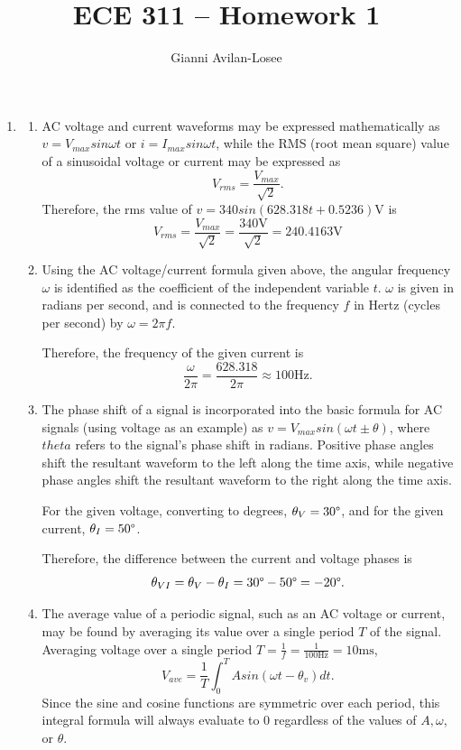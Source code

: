 \documentclass{article}
\title{ECE 311 -- Homework 1}
\author{Gianni Avilan-Losee}
\begin{document}

\begin{enumerate}
	\item
		\begin{enumerate}[label=\alph*)]
			\item AC voltage and current waveforms may be expressed mathematically as \(v = V_{max}sin\omega t\) or \(i = I_{max}sin\omega t\), while the RMS (root mean square) value of a sinusoidal voltage or current may be expressed as \[
					V_{rms} = \frac{V_{max}}{\sqrt{2}}.
			\] 
			Therefore, the rms value of \(v = 340sin(628.318t + 0.5236)\text{V}\) is \[
				V_{rms} = \frac{V_{max}}{\sqrt{2}} = \frac{340\text{V}}{\sqrt{2}} = 240.4163\text{V}
			\]
		  \item Using the AC voltage/current formula given above, the angular frequency \(\omega\) is identified as the coefficient of the independent variable \(t\). \(\omega\) is given in radians per second, and is connected to the frequency \(f\) in Hertz (cycles per second) by \(\omega = 2\pi f\).
				
				Therefore, the frequency of the given current is \[
					\frac{\omega}{2\pi} = \frac{628.318}{2\pi} \approx 100\text{Hz}.
				\]
			\item The phase shift of a signal is incorporated into the basic formula for AC signals (using voltage as an example) as \(v=V_{max}sin(\omega t \pm \theta)\), where \(theta\) refers to the signal's phase shift in radians. Positive phase angles shift the resultant waveform to the left along the time axis, while negative phase angles shift the resultant waveform to the right along the time axis. 

				For the given voltage, converting to degrees, \(\theta_V = 30\degree\), and for the given current, \(\theta_I = 50\degree\).

				Therefore, the difference between the current and voltage phases is \[\theta_{VI} = \theta_{V} - \theta_{I} = 30\degree -50\degree = -20\degree.\]
				
			\item The average value of a periodic signal, such as an AC voltage or current, may be found by averaging its value over a single period \(T\) of the signal. Averaging voltage over a single period \(T = \frac{1}{f} = \frac{1}{100\text{Hz}} = 10\text{ms}\), \[
					V_{ave} = \frac{1}{T}\int_{0}^{T}Asin(\omega t - \theta_{v})dt.
				\]
			  Since the sine and cosine functions are symmetric over each period, this integral formula will always evaluate to 0 regardless of the values of \(A, \omega\), or \(\theta\).


\end{enumerate}
\end{enumerate}
\end{document}
